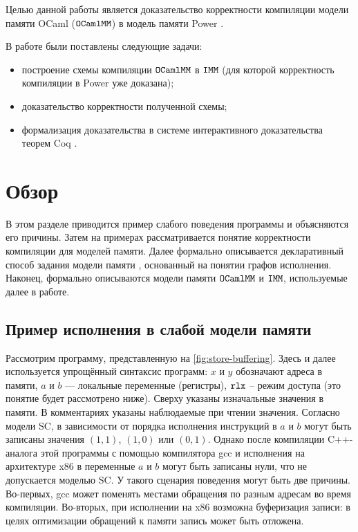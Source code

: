 Целью данной работы является доказательство корректности компиляции модели памяти OCaml ($\mathtt{OCaml}\allowbreak \mathtt{MM}$) в модель памяти Power \cite{power}. 

В работе были поставлены следующие задачи:

\begin{itemize}
\item построение схемы компиляции $\mathtt{OCaml}\allowbreak \mathtt{MM}$ в $\mathtt{IMM}$ (для которой корректность компиляции в Power уже доказана);
\item доказательство корректности полученной схемы;
\item формализация доказательства в системе интерактивного доказательства теорем Coq \cite{coq-description}.
\end{itemize}

\section{Обзор}

В этом разделе приводится пример слабого поведения программы и объясняются его причины. Затем на примерах рассматривается понятие корректности компиляции для моделей памяти. Далее формально описывается декларативный способ задания модели памяти \cite{power}, основанный на понятии графов исполнения. Наконец, формально описываются модели памяти $\mathtt{OCaml}\allowbreak \mathtt{MM}$ и $\mathtt{IMM}$, используемые далее в работе.

\subsection{Пример исполнения в слабой модели памяти}

Рассмотрим программу, представленную на \cref{fig:store-buffering}. Здесь и далее используется упрощённый синтаксис программ: $x$ и $y$ обозначают адреса в памяти, $a$ и $b$ — локальные переменные (регистры), $\mathtt{rlx}$ – режим доступа (это понятие будет рассмотрено ниже). Сверху указаны изначальные значения в памяти. В комментариях указаны наблюдаемые при чтении значения. Согласно модели SC, в зависимости от порядка исполнения инструкций в $a$ и $b$ могут быть записаны значения $(1, 1)$, $(1, 0)$ или $(0, 1)$. Однако после компиляции C++-аналога этой программы с помощью компилятора gcc и исполнения на архитектуре x86 в переменные $a$ и $b$ могут быть записаны нули, что не допускается моделью SC. У такого сценария поведения могут быть две причины. Во-первых, gcc может поменять местами обращения по разным адресам во время компиляции. Во-вторых, при исполнении на x86 возможна буферизация записи: в целях оптимизации обращений к памяти запись может быть отложена. 

